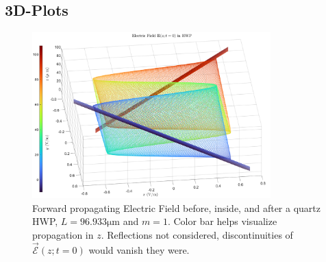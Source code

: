 \documentclass[aspectratio=169,t,xcolor=table]{beamer}
\begin{document}
        \subsection{3D-Plots}
        \begin{frame}
            \vspace{-0.7em}
            \begin{figure}[H]
                \centering
                \includegraphics[width=0.82\textwidth]{figs/EfieldInHWP4.png}
                \vspace{-0.7em}
                \caption{
                    Forward propagating Electric Field before, inside, and after
                    a quartz HWP, $L = 96.933\si{\micro \meter}$ and 
                    $m=1$. Color bar helps visualize propagation in $z$.
                    Reflections not considered, discontinuities of 
                    $\vec{\mathscr{E}}(z; t= 0)$ would vanish they were.
                }
                \label{fig:Q_HWP}
            \end{figure}
        \end{frame}
\end{document}

